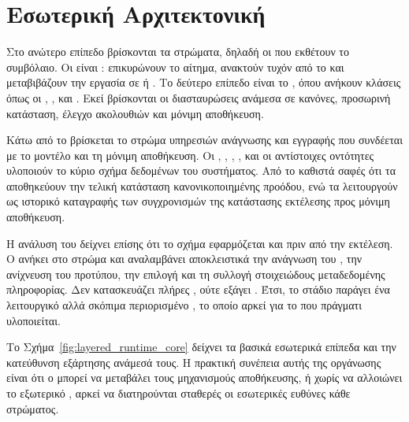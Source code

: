 \section{Εσωτερική  Αρχιτεκτονική }
\label{sec:layered_runtime_core}

Στο ανώτερο επίπεδο βρίσκονται τα  στρώματα, δηλαδή οι  που εκθέτουν το  συμβόλαιο. Οι  είναι : επικυρώνουν το αίτημα, ανακτούν τυχόν  από το  και μεταβιβάζουν την εργασία σε  ή . Το δεύτερο επίπεδο είναι το , όπου ανήκουν κλάσεις όπως οι \texttt{}, \texttt{}, \texttt{} και \texttt{}. Εκεί βρίσκονται οι διασταυρώσεις ανάμεσα σε  κανόνες, προσωρινή κατάσταση, έλεγχο ακολουθιών και μόνιμη αποθήκευση.

Κάτω από το  βρίσκεται το στρώμα υπηρεσιών ανάγνωσης και εγγραφής που συνδέεται με το  μοντέλο και τη μόνιμη αποθήκευση. Οι \texttt{}, \texttt{}, \texttt{}, \texttt{}, \texttt{} και οι αντίστοιχες  οντότητες υλοποιούν το κύριο σχήμα δεδομένων του συστήματος. Από το  \texttt{} καθιστά σαφές ότι τα  αποθηκεύουν την τελική κατάσταση κανονικοποιημένης προόδου, ενώ τα \texttt{} λειτουργούν ως ιστορικό καταγραφής των συγχρονισμών της κατάστασης εκτέλεσης προς μόνιμη αποθήκευση.

Η ανάλυση του  δείχνει επίσης ότι το  σχήμα εφαρμόζεται και πριν από την εκτέλεση. Ο \texttt{} ανήκει στο  στρώμα και αναλαμβάνει αποκλειστικά την ανάγνωση του \texttt{}, την ανίχνευση του προτύπου, την επιλογή  και τη συλλογή στοιχειώδους μεταδεδομένης πληροφορίας. Δεν κατασκευάζει πλήρες , ούτε εξάγει . Έτσι, το  στάδιο παράγει ένα λειτουργικό αλλά σκόπιμα περιορισμένο , το οποίο αρκεί για το  που πράγματι υλοποιείται.

Το Σχήμα~\ref{fig:layered_runtime_core} δείχνει τα βασικά εσωτερικά επίπεδα και την κατεύθυνση εξάρτησης ανάμεσά τους. Η πρακτική συνέπεια αυτής της οργάνωσης είναι ότι ο  μπορεί να μεταβάλει τους μηχανισμούς αποθήκευσης,  ή  χωρίς να αλλοιώνει το εξωτερικό  , αρκεί να διατηρούνται σταθερές οι εσωτερικές ευθύνες κάθε στρώματος.


